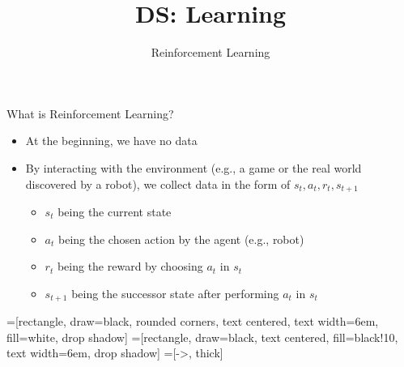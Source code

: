 \documentclass[aspectratio=169]{../latex_main/tntbeamer}  %
\title[Reinforcement Learning]{DS: Learning}
\subtitle{Reinforcement Learning}
\begin{document}
	
    \maketitle
    
    \begin{frame}{What is Reinforcement Learning?}

        \begin{itemize}
            \item At the beginning, we have \alert{no} data
            \item By interacting with the environment (e.g., a game or the real world discovered by a robot), we collect data in the form of $s_t, a_t, r_t, s_{t+1}$
            \begin{itemize}
                \item $s_t$ being the current state
                \item $a_t$ being the chosen action by the agent (e.g., robot)
                \item $r_t$ being the reward by choosing $a_t$ in $s_t$
                \item $s_{t+1}$ being the successor state after performing $a_t$ in $s_t$
            \end{itemize}
        \end{itemize}

        \centering
        =[rectangle, draw=black, rounded corners, text centered, text width=6em, fill=white, drop shadow]
        =[rectangle, draw=black, text centered, fill=black!10, text width=6em, drop shadow]
        =[->, thick]
        
\end{frame}
\end{document}
